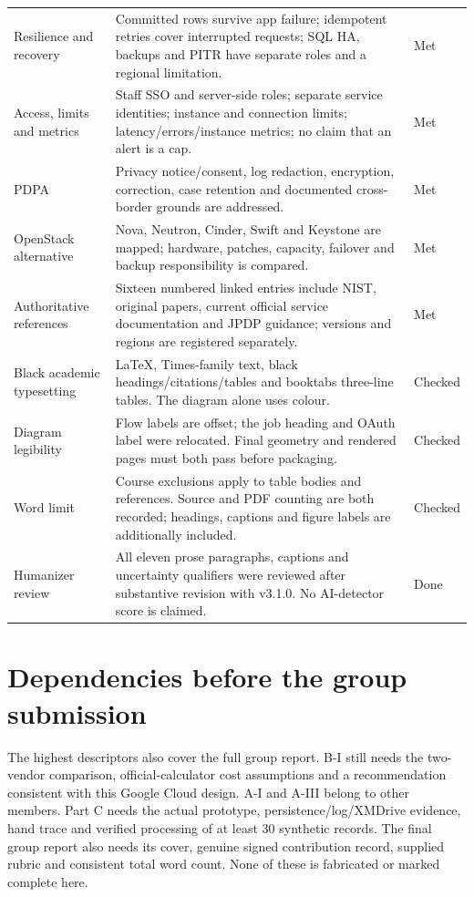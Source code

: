 \documentclass[a4paper,11pt]{article}
\begin{document}
\begin{longtable}{@{}p{.27\linewidth}p{.59\linewidth}p{.08\linewidth}@{}}
Resilience and recovery & Committed rows survive app failure; idempotent retries cover interrupted requests; SQL HA, backups and PITR have separate roles and a regional limitation. & Met \\
Access, limits and metrics & Staff SSO and server-side roles; separate service identities; instance and connection limits; latency/errors/instance metrics; no claim that an alert is a cap. & Met \\
PDPA & Privacy notice/consent, log redaction, encryption, correction, case retention and documented cross-border grounds are addressed. & Met \\
OpenStack alternative & Nova, Neutron, Cinder, Swift and Keystone are mapped; hardware, patches, capacity, failover and backup responsibility is compared. & Met \\
Authoritative references & Sixteen numbered linked entries include NIST, original papers, current official service documentation and JPDP guidance; versions and regions are registered separately. & Met \\
Black academic typesetting & LaTeX, Times-family text, black headings/citations/tables and booktabs three-line tables. The diagram alone uses colour. & Checked \\
Diagram legibility & Flow labels are offset; the job heading and OAuth label were relocated. Final geometry and rendered pages must both pass before packaging. & Checked \\
Word limit & Course exclusions apply to table bodies and references. Source and PDF counting are both recorded; headings, captions and figure labels are additionally included. & Checked \\
Humanizer review & All eleven prose paragraphs, captions and uncertainty qualifiers were reviewed after substantive revision with v3.1.0. No AI-detector score is claimed. & Done \\
\bottomrule
\end{longtable}
\normalsize

\section*{Dependencies before the group submission}
The highest descriptors also cover the full group report. B-I still needs the
two-vendor comparison, official-calculator cost assumptions and a recommendation
consistent with this Google Cloud design. A-I and A-III belong to other members.
Part C needs the actual prototype, persistence/log/XMDrive evidence, hand trace and
verified processing of at least 30 synthetic records. The final group report also
needs its cover, genuine signed contribution record, supplied rubric and
consistent total word count. None of these is fabricated or marked complete here.
\end{document}
